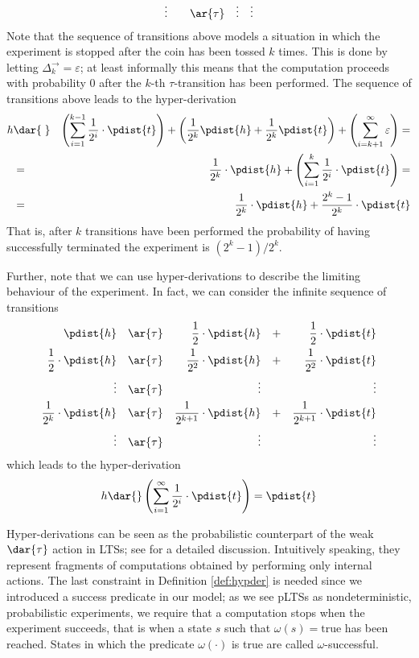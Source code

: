 \documentclass{LMCS}
\begin{document}
\begin{exa}
\begin{align*}
    \vdots&&&&\ar{\tau}&&\vdots&&\vdots
\end{align*}
Note that the sequence of transitions above models a situation in which the 
experiment is stopped after the coin has been tossed $k$ times. 
This is done by letting $\Delta_k^\rightarrow = \varepsilon$; 
at least informally this means that the computation proceeds with 
probability $0$ after the $k$-th $\tau$-transition has been performed.
The sequence of transitions above leads to the hyper-derivation 
\begin{eqnarray*}
h &\dar{\;}& \left(\sum_{i=1}^{k-1} \frac{1}{2^{i}} \cdot \pdist{t}\right) 
+ \left(\frac{1}{2^k} \pdist{h} + \frac{1}{2^k} \pdist{t}\right) 
+ \left(\sum_{i=k+1}^{\infty} \varepsilon\right) =\\
&=& \frac{1}{2^k} \cdot \pdist{h} + \left(\sum_{i=1}^k \frac{1}{2^i} \cdot \pdist{t}\right) =\\
&=& \frac{1}{2^k} \cdot \pdist{h} + \frac{2^{k}-1}{2^k} \cdot \pdist{t}
\end{eqnarray*}
That is, after $k$ transitions have been performed the probability of having 
successfully terminated the experiment is $(2^{k}-1)/2^k$.

Further, note that we can use hyper-derivations to describe the limiting behaviour of 
the experiment. In fact, we can consider the infinite sequence of 
transitions 
\begin{align*}
\pdist{h} &&\ar{\tau}&& \frac{1}{2} \cdot \pdist{h} &&+&& \frac{1}{2} \cdot \pdist{t}\\
 \frac{1}{2} \cdot \pdist{h} &&\ar{\tau}&& \frac{1}{2^2} \cdot \pdist{h} &&+&& \frac{1}{2^2} \cdot \pdist{t}\\
 \vdots&&\ar{\tau}&&\vdots&&&&\vdots\\
 \frac{1}{2^{k}} \cdot 
 \pdist{h} &&\ar{\tau}&& \frac{1}{2^{k+1}} \cdot \pdist{h} &&+&& \frac{1}{2^{k+1}} \cdot \pdist{t}\\
  \vdots&&\ar{\tau}&&\vdots&&&&\vdots\\
\end{align*}
which leads to the hyper-derivation 
\[
h \dar{} \left(\sum_{i=1}^{\infty} \frac{1}{2^{i}} \cdot \pdist{t}\right) = \pdist{t}
\]
\end{exa}\medskip

\noindent Hyper-derivations can be seen as the probabilistic counterpart of the weak $\dar{\tau}$ action in 
LTSs; see \cite{DGHM09full} for a detailed discussion. 
Intuitively speaking, they represent fragments of computations obtained by performing only internal 
actions. The last constraint in Definition \ref{def:hypder} is needed since we introduced a success 
predicate in our model; as we see pLTSs as nondeterministic, probabilistic 
experiments, we require that a computation stops  
when the experiment succeeds, that is when a state $s$ such that  
$\omega(s) = \mbox{true}$ has been reached.
States in which the predicate $\omega(\cdot)$ 
is true are called $\omega$-successful.
\end{document}
